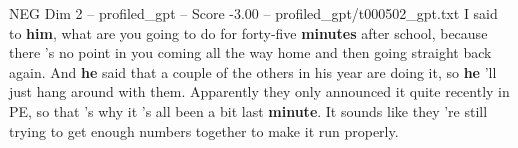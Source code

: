\begin{textsample}{NEG Dim 2 – profiled\_gpt – Score -3.00 – profiled\_gpt/t000502\_gpt.txt}  \label{ex:f2_neg_034}
I said to \textbf{him}, what are you going to do for forty‑five \textbf{minutes} after school, because there ’s no point in you coming all the way home and then going straight back again.
And \textbf{he} said that a couple of the others in his year are doing it, so \textbf{he} ’ll just hang around with them.
Apparently they only announced it quite recently in PE, so that ’s why it ’s all been a bit last \textbf{minute}.
It sounds like they ’re still trying to get enough numbers together to make it run properly.

\end{textsample}
